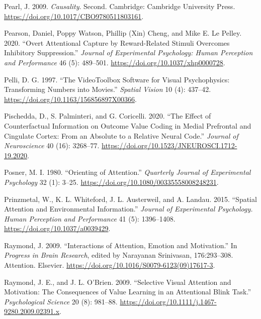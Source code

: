 \documentclass[11pt,halfline,a4paper,]{ouparticle}
\newlength{\cslhangindent}
\newenvironment{cslreferences}%
  {\setlength{\parindent}{0pt}%
  \everypar{\setlength{\hangindent}{\cslhangindent}}\ignorespaces}%
  {\par}
\begin{document}
\begin{cslreferences}
\leavevmode\hypertarget{ref-pearlCausality2009}{}%
Pearl, J. 2009. \emph{Causality}. Second. Cambridge: Cambridge University Press. \url{https://doi.org/10.1017/CBO9780511803161}.

\leavevmode\hypertarget{ref-pearsonOvertAttentionalCapture2020}{}%
Pearson, Daniel, Poppy Watson, Phillip (Xin) Cheng, and Mike E. Le Pelley. 2020. ``Overt Attentional Capture by Reward-Related Stimuli Overcomes Inhibitory Suppression.'' \emph{Journal of Experimental Psychology: Human Perception and Performance} 46 (5): 489--501. \url{https://doi.org/10.1037/xhp0000728}.

\leavevmode\hypertarget{ref-pelliVideoToolboxSoftwareVisual1997}{}%
Pelli, D. G. 1997. ``The VideoToolbox Software for Visual Psychophysics: Transforming Numbers into Movies.'' \emph{Spatial Vision} 10 (4): 437--42. \url{https://doi.org/10.1163/156856897X00366}.

\leavevmode\hypertarget{ref-pischeddaEffectCounterfactualInformation2020}{}%
Pischedda, D., S. Palminteri, and G. Coricelli. 2020. ``The Effect of Counterfactual Information on Outcome Value Coding in Medial Prefrontal and Cingulate Cortex: From an Absolute to a Relative Neural Code.'' \emph{Journal of Neuroscience} 40 (16): 3268--77. \url{https://doi.org/10.1523/JNEUROSCI.1712-19.2020}.

\leavevmode\hypertarget{ref-posnerOrientingAttention1980a}{}%
Posner, M. I. 1980. ``Orienting of Attention.'' \emph{Quarterly Journal of Experimental Psychology} 32 (1): 3--25. \url{https://doi.org/10.1080/00335558008248231}.

\leavevmode\hypertarget{ref-prinzmetalSpatialAttentionEnvironmental2015}{}%
Prinzmetal, W., K. L. Whiteford, J. L. Austerweil, and A. Landau. 2015. ``Spatial Attention and Environmental Information.'' \emph{Journal of Experimental Psychology. Human Perception and Performance} 41 (5): 1396--1408. \url{https://doi.org/10.1037/a0039429}.

\leavevmode\hypertarget{ref-raymondInteractionsAttentionEmotion2009}{}%
Raymond, J. 2009. ``Interactions of Attention, Emotion and Motivation.'' In \emph{Progress in Brain Research}, edited by Narayanan Srinivasan, 176:293--308. Attention. Elsevier. \url{https://doi.org/10.1016/S0079-6123(09)17617-3}.

\leavevmode\hypertarget{ref-raymondSelectiveVisualAttention2009a}{}%
Raymond, J. E., and J. L. O'Brien. 2009. ``Selective Visual Attention and Motivation: The Consequences of Value Learning in an Attentional Blink Task.'' \emph{Psychological Science} 20 (8): 981--88. \url{https://doi.org/10.1111/j.1467-9280.2009.02391.x}.


\end{cslreferences}
\end{document}
